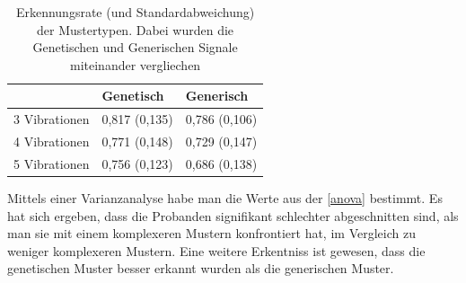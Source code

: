 \begin{table}[]
\centering
\caption{Erkennungsrate (und Standardabweichung) der Mustertypen. Dabei wurden die Genetischen und Generischen Signale miteinander vergliechen}
\label{anova}
\begin{tabular}{l|ll}
              & Genetisch     & Generisch     \\ \hline
3 Vibrationen & 0,817 (0,135) & 0,786 (0,106) \\
4 Vibrationen & 0,771 (0,148) & 0,729 (0,147) \\
5 Vibrationen & 0,756 (0,123) & 0,686 (0,138)
\end{tabular}
\end{table}

Mittels einer Varianzanalyse habe man die Werte aus der \autoref{anova} bestimmt. 
Es hat sich ergeben, dass die Probanden signifikant schlechter abgeschnitten sind, als man sie mit einem komplexeren Mustern konfrontiert hat, im Vergleich zu weniger komplexeren Mustern. 
Eine weitere Erkentniss ist gewesen, dass die genetischen Muster besser erkannt wurden als die generischen Muster.














